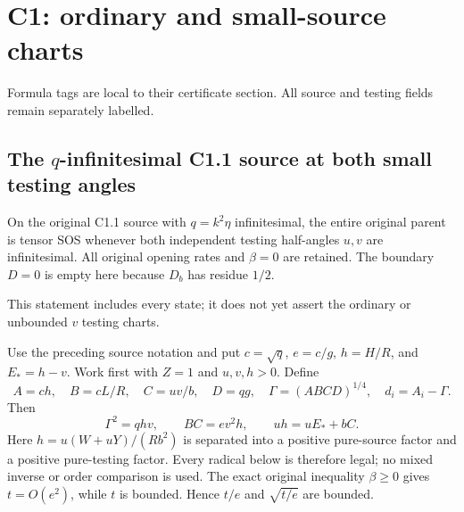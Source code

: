 \chapter{C1: ordinary and small-source charts}
\label{ch:cert-3}
Formula tags are local to their certificate section. All source and testing fields remain separately labelled.

\section{\texorpdfstring{The $q$-infinitesimal C1.1 source at both small testing angles}{The q-infinitesimal C1.1 source at both small testing angles}}
\label{component:pc376284fc7ae}

\label{pc376284fc7ae:sec:r7-c1-q-inf-local}
\begin{theorem}
On the original C1.1 source with $q=k^2\eta$ infinitesimal, the entire
original parent is tensor SOS whenever both independent testing
half-angles $u,v$ are infinitesimal. All original opening rates and
$\beta=0$ are retained. The boundary $D=0$ is empty here because
$D_b$ has residue $1/2$.
\end{theorem}
This statement includes every state; it does not yet assert the
ordinary or unbounded $v$ testing charts.

Use the preceding source notation and put $c=\sqrt q$, $e=c/g$,
$h=H/R$, and $E_*=h-v$. Work first with $Z=1$ and $u,v,h>0$.
Define
\[
 A=ch,\quad B=cL/R,\quad C=uv/b,\quad D=qg,\quad
 \Gamma=(ABCD)^{1/4},\quad d_i=A_i-\Gamma.
\]
Then
\[
 \Gamma^2=qhv,\qquad BC=e v^2h,\qquad
 u h=uE_*+bC.
 \tag{QI1}
\]
Here $h=u(W+uY)/(Rb^2)$ is separated into a positive pure-source
factor and a positive pure-testing factor. Every radical below is
therefore legal; no mixed inverse or order comparison is used.
The exact original inequality $\beta\ge0$ gives $t=O(e^2)$, while
$t$ is bounded. Hence $t/e$ and $\sqrt{t/e}$ are bounded.

